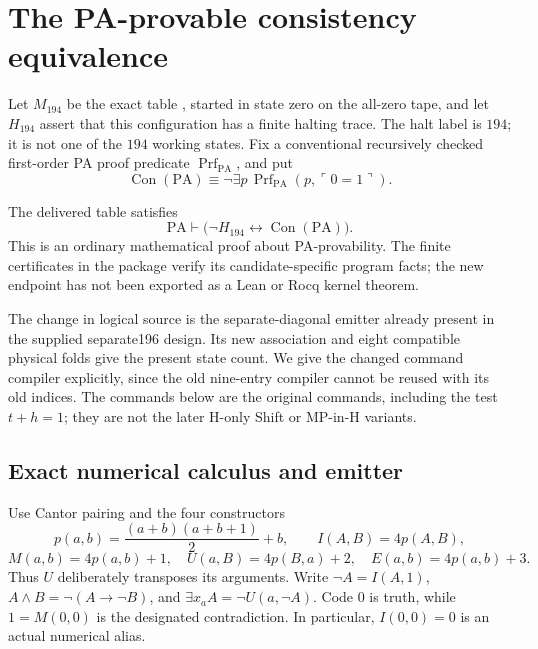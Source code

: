 \section{The PA-provable consistency equivalence}
\label{sec:pa194-calibration}

Let $M_{194}$ be the exact table , started in
state zero on the all-zero tape, and let $H_{194}$ assert that this
configuration has a finite halting trace. The halt label is $194$;
it is not one of the $194$ working states. Fix a conventional recursively
checked first-order PA proof predicate $\operatorname{Prf}_{\mathrm{PA}}$,
and put
\[
 \operatorname{Con}(\mathrm{PA})\equiv
 \neg\exists p\,\operatorname{Prf}_{\mathrm{PA}}
                 (p,\ulcorner0=1\urcorner).
\]

\begin{theorem}\label{thm:pa194-equivalence}
The delivered table satisfies
\[
 \mathrm{PA}\vdash
       \bigl(\neg H_{194}\leftrightarrow
                        \operatorname{Con}(\mathrm{PA})\bigr).
\]
This is an ordinary mathematical proof about PA-provability. The finite
certificates in the package verify its candidate-specific program facts;
the new endpoint has not been exported as a Lean or Rocq kernel theorem.
\end{theorem}

The change in logical source is the separate-diagonal emitter already
present in the supplied separate196 design. Its new association and
eight compatible physical folds give the present state count. We give
the changed command compiler explicitly, since the old nine-entry
compiler cannot be reused with its old indices. The commands below are
the original commands, including the test $t+h=1$; they are not the
later H-only Shift or MP-in-H variants.

\subsection{Exact numerical calculus and emitter}

Use Cantor pairing and the four constructors
\[
 p(a,b)=\frac{(a+b)(a+b+1)}2+b,\qquad I(A,B)=4p(A,B),
\]
\[
 M(a,b)=4p(a,b)+1,\quad U(a,B)=4p(B,a)+2,
 \quad E(a,b)=4p(a,b)+3.
\]
Thus $U$ deliberately transposes its arguments. Write
$\neg A=I(A,1)$, $A\wedge B=\neg(A\to\neg B)$, and
$\exists x_a A=\neg U(a,\neg A)$. Code $0$ is truth, while
$1=M(0,0)$ is the designated contradiction. In particular,
$I(0,0)=0$ is an actual numerical alias.

